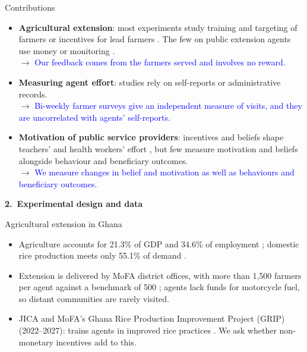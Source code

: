 \documentclass[aspectratio=169]{beamer}
\newcommand{\footsec}{}
\begin{document}
\begin{frame}{Contributions}
	\begin{itemize}\small
		\item \textbf{Agricultural extension}: most experiments study training and targeting of farmers \citep{benyishay_social_2019, Beaman2021} or incentives for lead farmers \citep{shikuku_incentives_2019, balew_incentivizing_2023}.
        The few on public extension agents use money or monitoring \citep{alam_incentives_2024, Genicot2022}.\\ $\to$ \textcolor{blue}{Our feedback comes from the farmers served and involves no reward.}
		\vspace{0.2cm}
		\item \textbf{Measuring agent effort}: studies rely on self-reports or administrative records.\\
        $\to$ \textcolor{blue}{Bi-weekly farmer surveys give an independent measure of visits, and they are uncorrelated with agents' self-reports.}
		\vspace{0.2cm}
		\item \textbf{Motivation of public service providers}: incentives and beliefs shape teachers' and health workers' effort \citep{duflo_incentives_2012, ashraf_awards_2014, banuri_pro-social_2016, khan_mission_2025}, but few measure motivation and beliefs alongside behaviour and beneficiary outcomes. \\
        $\to$ \textcolor{blue}{We measure changes in belief and motivation as well as behaviours and beneficiary outcomes.}
	\end{itemize}
\end{frame}

\renewcommand{\footsec}{2.~Experimental design and data}
\begin{frame}
	\vfill
	\centering
	{\Huge\bfseries\textcolor{myGreen}{2.~Experimental design and data}}
	\vfill
\end{frame}

\begin{frame}{Agricultural extension in Ghana}
	\begin{itemize}
		\item Agriculture accounts for 21.3\% of GDP and 34.6\% of employment
		\citep{worldbank_wdi_2026}; domestic rice production meets only 55.1\% of demand
		\citep{ndpc_progress_2025}.
		\vspace{0.3cm}
		\item Extension is delivered by MoFA district offices, with more than 1{,}500 farmers
		per agent against a benchmark of 500 \citep{MoFA2025Extension}; agents lack funds for
		motorcycle fuel, so distant communities are rarely visited.
		\vspace{0.3cm}
		\item JICA and MoFA's Ghana Rice Production Improvement Project (GRIP) (2022--2027): trains agents in improved rice practices \citep{jica_grip_2022}. We ask whether non-monetary incentives add to this.
	\end{itemize}
\end{frame}
\end{document}
